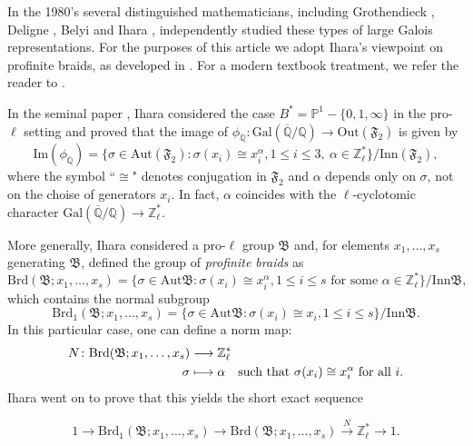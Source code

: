 \documentclass[10pt]{amsart}
\theoremstyle{definition}
\newcommand{\Z}{\mathbb{Z}}
\newcommand{\Q}{\mathbb{Q}}
\newcommand{\A}{{ \mathrm{Aut} }}
\newcommand{\im}{{ \mathrm{Im} }}
\newcommand{\Gal}{{ \mathrm{Gal}}}
\newcommand{\Out}{{ \mathrm{Out}}}
\begin{document}
In the 1980's several distinguished mathematicians, including Grothendieck \cite{MR1483107}, Deligne \cite{Deligne89}, Belyi \cite{Belyi1} and Ihara \cite{Ihara1985-it}, independently studied these types of large Galois representations. For the purposes of this article we adopt Ihara's viewpoint on profinite braids, as developed in \cite{Ihara1985-it}. For a modern textbook treatment, we refer the reader to \cite[Ch.4]{MR2548205}. 

In the seminal paper \cite{Ihara1985-it}, Ihara considered the case $B^* = \mathbb{P}^1-\{0,1,\infty\}$ in the pro-$\ell$ setting and proved that the image of $\phi_{\mathbb{Q}} \colon \Gal(\overline{\Q}/\Q) \to  \Out(\mathfrak{F}_2)$ is given by
\[ \im (\phi_\Q) = \{\sigma \in \A(\mathfrak{F}_2):  \sigma(x_i)\cong x_i^\alpha, 1\leq i \leq 3, \ \alpha \in \Z_\ell^* \}/\mathrm{Inn}(\mathfrak{F}_2),\]
where the symbol ``$\cong$" denotes conjugation in $ \mathfrak{F}_2$ and $\alpha$ depends only on $\sigma$, not on the choise of generators $x_i$. In fact, $\alpha$ coincides with the $\ell$-cyclotomic character $\Gal(\overline{\Q}/\Q)\rightarrow \Z_\ell^*$. 

More generally, Ihara considered a pro-$\ell$ group $\mathfrak{B}$ and, for elements $x_1, \ldots, x_s$ generating $\mathfrak{B}$, defined the group of {\em profinite braids} as
\[
  \mathrm{Brd}(\mathfrak{B};x_1, \ldots, x_s)=\{\sigma \in \mathrm{Aut} \mathfrak{B}: \sigma(x_i) \cong  x_i^\alpha, 1\leq i \leq s
  \text{ for some } \alpha \in \mathbb{Z}_\ell^*
  \}/\mathrm{Inn} \mathfrak{B},
\] 
which contains the normal subgroup
\[
  \mathrm{Brd}_1(\mathfrak{B};x_1, \ldots, x_s)=\{\sigma \in \mathrm{Aut} \mathfrak{B}: \sigma(x_i) \cong  x_i, 1\leq i \leq s
  \}/\mathrm{Inn} \mathfrak{B}.
\]
In this particular case, one can define a norm map:
\begin{align*}
  N \colon \mathrm{Brd}(\mathfrak{B}; x_1, \ldots, x_s) &\longrightarrow \mathbb{Z}_\ell^* \notag \\
  \sigma &\longmapsto \alpha \quad \text{such that } \sigma(x_i) \cong x_i^\alpha \text{ for all } i.
\end{align*}
Ihara went on to prove that this yields the short exact sequence

\begin{equation}\label{BrdNorm}
 1 \rightarrow 
 \mathrm{Brd}_1(\mathfrak{B};x_1, \ldots, x_s) \longrightarrow 
 \mathrm{Brd}(\mathfrak{B};x_1, \ldots, x_s) 
 \stackrel{N}{\longrightarrow} \Z_\ell^* \longrightarrow  1.
\end{equation}
\end{document}
